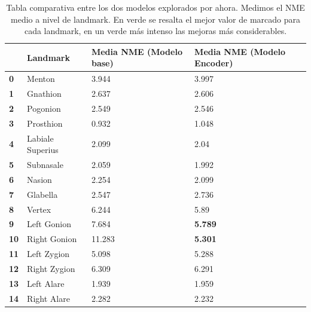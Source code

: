             \begin{table}[!ht]
                \centering
                \caption{Tabla comparativa entre los dos modelos explorados por ahora. Medimos el NME medio a nivel de landmark. En verde se resalta el mejor valor de marcado para cada landmark, en un verde más intenso las mejoras más considerables.}
                \begin{tabular}{|l|l|l|l|}
                \hline
                    \textbf{} & \cellcolor{gray!25}\textbf{Landmark} & \cellcolor{gray!25}\textbf{Media NME (Modelo base)} & \cellcolor{gray!25}\textbf{Media NME (Modelo Encoder)} \\ \hline
                    \textbf{0} & Menton & \cellcolor{green!25} 3.944 & 3.997 \\ \hline
                    \textbf{1} & Gnathion & 2.637 & \cellcolor{green!25} 2.606 \\ \hline
                    \textbf{2} & Pogonion & 2.549 & \cellcolor{green!25} 2.546 \\ \hline
                    \textbf{3} & Prosthion & \cellcolor{green!25} 0.932 & 1.048 \\ \hline
                    \textbf{4} & Labiale Superius & 2.099 & \cellcolor{green!25} 2.04 \\ \hline
                    \textbf{5} & Subnasale & 2.059 & \cellcolor{green!25} 1.992 \\ \hline
                    \textbf{6} & Nasion & 2.254 & \cellcolor{green!25} 2.099 \\ \hline
                    \textbf{7} & Glabella & \cellcolor{green!25} 2.547 & 2.736 \\ \hline
                    \textbf{8} & Vertex & 6.244 &\cellcolor{green!25} 5.89 \\ \hline
                    \textbf{9} & Left Gonion & 7.684 & \cellcolor{green!50} \textbf{5.789} \\ \hline
                    \textbf{10} & Right Gonion & 11.283 & \cellcolor{green!50} \textbf{5.301} \\ \hline
                    \textbf{11} & Left Zygion & \cellcolor{green!25} 5.098 & 5.288 \\ \hline
                    \textbf{12} & Right Zygion & 6.309 & \cellcolor{green!25} 6.291 \\ \hline
                    \textbf{13} & Left Alare & \cellcolor{green!25} 1.939 & 1.959 \\ \hline
                    \textbf{14} & Right Alare & 2.282 & \cellcolor{green!25} 2.232 \\ \hline

\end{tabular}
\end{table}
